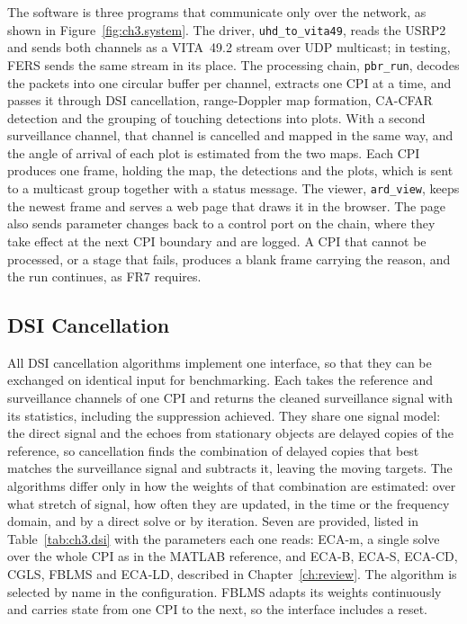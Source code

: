 The software is three programs that communicate only over the network, as shown in Figure~\ref{fig:ch3.system}. The driver, \texttt{uhd\_to\_vita49}, reads the USRP2 and sends both channels as a VITA~49.2 stream over UDP multicast; in testing, FERS sends the same stream in its place. The processing chain, \texttt{pbr\_run}, decodes the packets into one circular buffer per channel, extracts one CPI at a time, and passes it through DSI cancellation, range-Doppler map formation, CA-CFAR detection and the grouping of touching detections into plots. With a second surveillance channel, that channel is cancelled and mapped in the same way, and the angle of arrival of each plot is estimated from the two maps. Each CPI produces one frame, holding the map, the detections and the plots, which is sent to a multicast group together with a status message. The viewer, \texttt{ard\_view}, keeps the newest frame and serves a web page that draws it in the browser. The page also sends parameter changes back to a control port on the chain, where they take effect at the next CPI boundary and are logged. A CPI that cannot be processed, or a stage that fails, produces a blank frame carrying the reason, and the run continues, as FR7 requires.

\subsection{DSI Cancellation}
\label{subsec:ch3.stages.dsi}

All DSI cancellation algorithms implement one interface, so that they can be exchanged on identical input for benchmarking. Each takes the reference and surveillance channels of one CPI and returns the cleaned surveillance signal with its statistics, including the suppression achieved. They share one signal model: the direct signal and the echoes from stationary objects are delayed copies of the reference, so cancellation finds the combination of delayed copies that best matches the surveillance signal and subtracts it, leaving the moving targets. The algorithms differ only in how the weights of that combination are estimated: over what stretch of signal, how often they are updated, in the time or the frequency domain, and by a direct solve or by iteration. Seven are provided, listed in Table~\ref{tab:ch3.dsi} with the parameters each one reads: ECA-m, a single solve over the whole CPI as in the MATLAB reference, and ECA-B, ECA-S, ECA-CD, CGLS, FBLMS and ECA-LD, described in Chapter~\ref{ch:review}. The algorithm is selected by name in the configuration. FBLMS adapts its weights continuously and carries state from one CPI to the next, so the interface includes a reset.

